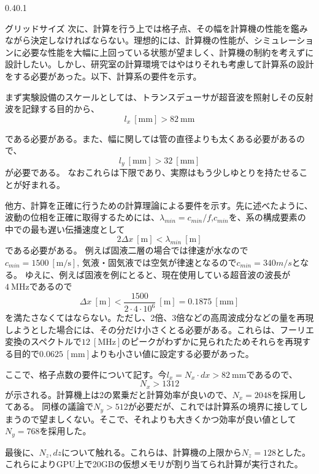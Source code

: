 \documentclass[uplatex]{suribt}
\makeatletter
\renewcommand{\subsection}{%
    \@startsection{subsection}{1}{\z@}%
    {0.4\Cvs}{0.1\Cvs}%
    {\normalfont\normalsize\headfont\raggedright}}
\makeatother
\begin{document}
\subsection{グリッドサイズ}
次に、計算を行う上では格子点、その幅を計算機の性能を鑑みながら決定しなければならない。理想的には、計算機の性能が、シミュレーションに必要な性能を大幅に上回っている状態が望ましく、計算機の制約を考えずに設計したい。しかし、研究室の計算環境ではやはりそれも考慮して計算系の設計をする必要があった。以下、計算系の要件を示す。\par
まず実験設備のスケールとしては、トランスデューサが超音波を照射しその反射波を記録する目的から、
\begin{equation}
    l_x\ [\mathrm{mm}] > 82 \ \mathrm{mm}
\end{equation}\par
である必要がある。また、幅に関しては管の直径よりも太くある必要があるので、
\begin{equation}
    l_y \ [\mathrm{mm}]> 32 \ [\mathrm{mm}]
\end{equation}
が必要である。
なおこれらは下限であり、実際はもう少しゆとりを持たせることが好まれる。\par
他方、計算を正確に行うための計算理論による要件を示す。先に述べたように、波動の位相を正確に取得するためには、$\lambda_{min}=c_{min}/f$,$c_{min}$を、系の構成要素の中での最も遅い伝播速度として
\begin{equation}
    2 \Delta x\ [\mathrm{m}] < \lambda _{min}\ [\mathrm{m}]
\end{equation}
である必要がある。
例えば固液二層の場合では律速が水なので$c_{min}=1500 \ [\mathrm{m/s}]$, 気液・固気液では空気が律速となるので$c_{min}=340 m/s$となる。
ゆえに、例えば固液を例にとると、現在使用している超音波の波長が$4 \ \mathrm{MHz}$であるので
\begin{equation}
    \Delta x \ [\mathrm{m}]< \frac{1500}{2 \cdot 4 \cdot 10^6} \ [\mathrm{m}]= 0.1875 \ [\mathrm{mm}]
\end{equation}
を満たさなくてはならない。ただし、2倍、3倍などの高周波成分などの量を再現しようとした場合には、その分だけ小さくとる必要がある。これらは、フーリエ変換のスペクトルで$12 \ [\mathrm{MHz}]$のピークがわずかに見られたためそれらを再現する目的で$0.0625 \ [\mathrm{mm}]$よりも小さい値に設定する必要があった。\par
ここで、格子点数の要件について記す。今$l_x =N_x \cdot dx > 82 \ \mathrm{mm}$であるので、
\begin{equation}
    N_x > 1312
\end{equation}
が示される。計算機上は2の累乗だと計算効率が良いので、$N_x=2048$を採用してある。
同様の議論で$N_y > 512$が必要だが、これでは計算系の境界に接してしまうので望ましくない。そこで、それよりも大きくかつ効率が良い値として$N_y=768$を採用した。\par
最後に、$N_z, dz$について触れる。これらは、計算機の上限から$N_z=128$とした。これらによりGPU上で20GBの仮想メモリが割り当てられ計算が実行された。
\end{document}
